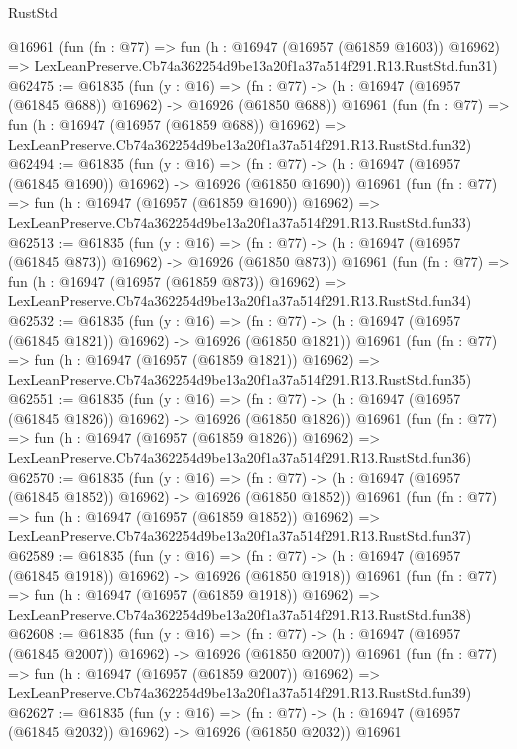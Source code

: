 \begin{lexlean}{RustStd}
\begin{coremodule}
    @16961
    (fun (fn : @77) =>
    fun (h : @16947 (@16957 (@61859 @1603)) @16962) =>
    LexLeanPreserve.Cb74a362254d9be13a20f1a37a514f291.R13.RustStd.fun31)
@62475 := @61835
    (fun (y : @16) =>
    (fn : @77) -> (h : @16947 (@16957 (@61845 @688)) @16962) -> @16926 (@61850 @688))
    @16961
    (fun (fn : @77) =>
    fun (h : @16947 (@16957 (@61859 @688)) @16962) =>
    LexLeanPreserve.Cb74a362254d9be13a20f1a37a514f291.R13.RustStd.fun32)
@62494 := @61835
    (fun (y : @16) =>
    (fn : @77) -> (h : @16947 (@16957 (@61845 @1690)) @16962) -> @16926 (@61850 @1690))
    @16961
    (fun (fn : @77) =>
    fun (h : @16947 (@16957 (@61859 @1690)) @16962) =>
    LexLeanPreserve.Cb74a362254d9be13a20f1a37a514f291.R13.RustStd.fun33)
@62513 := @61835
    (fun (y : @16) =>
    (fn : @77) -> (h : @16947 (@16957 (@61845 @873)) @16962) -> @16926 (@61850 @873))
    @16961
    (fun (fn : @77) =>
    fun (h : @16947 (@16957 (@61859 @873)) @16962) =>
    LexLeanPreserve.Cb74a362254d9be13a20f1a37a514f291.R13.RustStd.fun34)
@62532 := @61835
    (fun (y : @16) =>
    (fn : @77) -> (h : @16947 (@16957 (@61845 @1821)) @16962) -> @16926 (@61850 @1821))
    @16961
    (fun (fn : @77) =>
    fun (h : @16947 (@16957 (@61859 @1821)) @16962) =>
    LexLeanPreserve.Cb74a362254d9be13a20f1a37a514f291.R13.RustStd.fun35)
@62551 := @61835
    (fun (y : @16) =>
    (fn : @77) -> (h : @16947 (@16957 (@61845 @1826)) @16962) -> @16926 (@61850 @1826))
    @16961
    (fun (fn : @77) =>
    fun (h : @16947 (@16957 (@61859 @1826)) @16962) =>
    LexLeanPreserve.Cb74a362254d9be13a20f1a37a514f291.R13.RustStd.fun36)
@62570 := @61835
    (fun (y : @16) =>
    (fn : @77) -> (h : @16947 (@16957 (@61845 @1852)) @16962) -> @16926 (@61850 @1852))
    @16961
    (fun (fn : @77) =>
    fun (h : @16947 (@16957 (@61859 @1852)) @16962) =>
    LexLeanPreserve.Cb74a362254d9be13a20f1a37a514f291.R13.RustStd.fun37)
@62589 := @61835
    (fun (y : @16) =>
    (fn : @77) -> (h : @16947 (@16957 (@61845 @1918)) @16962) -> @16926 (@61850 @1918))
    @16961
    (fun (fn : @77) =>
    fun (h : @16947 (@16957 (@61859 @1918)) @16962) =>
    LexLeanPreserve.Cb74a362254d9be13a20f1a37a514f291.R13.RustStd.fun38)
@62608 := @61835
    (fun (y : @16) =>
    (fn : @77) -> (h : @16947 (@16957 (@61845 @2007)) @16962) -> @16926 (@61850 @2007))
    @16961
    (fun (fn : @77) =>
    fun (h : @16947 (@16957 (@61859 @2007)) @16962) =>
    LexLeanPreserve.Cb74a362254d9be13a20f1a37a514f291.R13.RustStd.fun39)
@62627 := @61835
    (fun (y : @16) =>
    (fn : @77) -> (h : @16947 (@16957 (@61845 @2032)) @16962) -> @16926 (@61850 @2032))
    @16961

\end{coremodule}
\end{lexlean}
